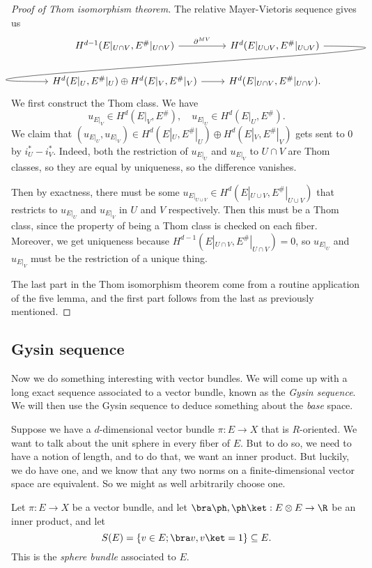 \documentclass[a4paper]{article}
\theoremstyle{definition}
\begin{document}
\begin{proof}[Proof of Thom isomorphism theorem]
  The relative Mayer-Vietoris sequence gives us
  \[
    \begin{tikzcd}
      H^{d - 1}(E|_{U \cap V}, E^\#|_{U \cap V}) \ar[r, "\partial^{MV}"] & H^d(E|_{U\cup V}, E^\#|_{U\cup V}) \ar[out=0, in=180, looseness=2, overlay, dl]\\
      H^d(E|_U, E^\#|_U) \oplus H^d(E|_V, E^\#|_V) \ar[r] & H^d(E|_{U \cap V}, E^\#|_{U \cap V}).
    \end{tikzcd}
  \]
  We first construct the Thom class. We have
  \[
    u_{E|_V} \in H^d(E|_V, E^\#),\quad u_{E|_U} \in H^d(E|_U, E^\#).
  \]
  We claim that $(u_{E|_U}, u_{E|_V}) \in H^d(E|_U, E^\#|_U) \oplus H^d(E|_V, E^\#|_V)$ gets sent to $0$ by $i_U^* - i_V^*$. Indeed, both the restriction of $u_{E|_U}$ and $u_{E|_V}$ to $U \cap V$ are Thom classes, so they are equal by uniqueness, so the difference vanishes.

  Then by exactness, there must be some $u_{E|_{U\cup V}} \in H^d(E|_{U \cup V}, E^\#|_{U \cup V})$ that restricts to $u_{E|_U}$ and $u_{E|_V}$ in $U$ and $V$ respectively. Then this must be a Thom class, since the property of being a Thom class is checked on each fiber. Moreover, we get uniqueness because $H^{d - 1}(E|_{U \cap V}, E^\#|_{U \cap V}) = 0$, so $u_{E|_U}$ and $u_{E|_V}$ must be the restriction of a unique thing.

  The last part in the Thom isomorphism theorem come from a routine application of the five lemma, and the first part follows from the last as previously mentioned.
\end{proof}

\subsection{Gysin sequence}
Now we do something interesting with vector bundles. We will come up with a long exact sequence associated to a vector bundle, known as the \emph{Gysin sequence}. We will then use the Gysin sequence to deduce something about the \emph{base} space.

Suppose we have a $d$-dimensional vector bundle $\pi: E \to X$ that is $R$-oriented. We want to talk about the unit sphere in every fiber of $E$. But to do so, we need to have a notion of length, and to do that, we want an inner product. But luckily, we do have one, and we know that any two norms on a finite-dimensional vector space are equivalent. So we might as well arbitrarily choose one.

\begin{defi}
  Let $\pi: E \to X$ be a vector bundle, and let $\bra \ph, \ph\ket : E \otimes E \to \R$ be an inner product, and let
  \[
    S(E) = \{v \in E; \bra v, v\ket = 1\} \subseteq E.
  \]
  This is the \emph{sphere bundle} associated to $E$.
\end{defi}
\end{document}
